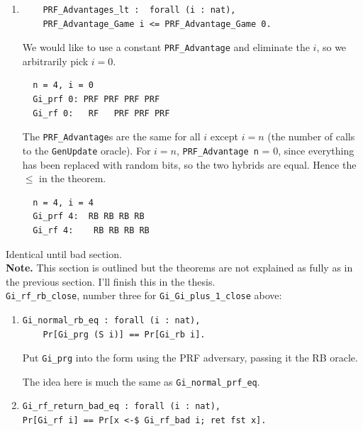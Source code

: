 \documentclass[12pt,lot, lof]{puthesis}
\newcommand{\li} {\lstinline}
\begin{document}
{\begin{enumerate}
  \par
\item 
\begin{lstlisting}
    PRF_Advantages_lt :  forall (i : nat), 
    PRF_Advantage_Game i <= PRF_Advantage_Game 0.
    \end{lstlisting}
    
    We would like to use a constant \li|PRF_Advantage| and eliminate the $i$, so we arbitrarily pick $i = 0$. 
    
  \begin{lstlisting}
  n = 4, i = 0
  Gi_prf 0: PRF PRF PRF PRF 
  Gi_rf 0:   RF   PRF PRF PRF 
  \end{lstlisting}
  
  The \li|PRF_Advantage|s are the same for all $i$ except $i=n$ (the number of calls to the \li|GenUpdate| oracle). For $i=n$, \li|PRF_Advantage n| = 0, since everything has been replaced with random bits, so the two hybrids are equal. Hence the $\leq$ in the theorem.
  
  \begin{lstlisting}
  n = 4, i = 4
  Gi_prf 4:  RB RB RB RB
  Gi_rf 4:    RB RB RB RB
  \end{lstlisting}  
    
\end{enumerate}

Identical until bad section. 
\\ \textbf{Note.} This section is outlined but the theorems are not explained as fully as in the previous section. I'll finish this in the thesis.
\\

\lstinline|Gi_rf_rb_close|, number three for \lstinline|Gi_Gi_plus_1_close| above:
\begin{enumerate}
\par
\item \begin{lstlisting}
Gi_normal_rb_eq : forall (i : nat),
    Pr[Gi_prg (S i)] == Pr[Gi_rb i].
    \end{lstlisting} 
    
Put \li|Gi_prg| into the form using the PRF adversary, passing it the RB oracle.

The idea here is much the same as \li|Gi_normal_prf_eq|.

\par
\item \begin{lstlisting} 
Gi_rf_return_bad_eq : forall (i : nat),
Pr[Gi_rf i] == Pr[x <-$ Gi_rf_bad i; ret fst x].
  \end{lstlisting}
  

\end{enumerate}}
\end{document}
